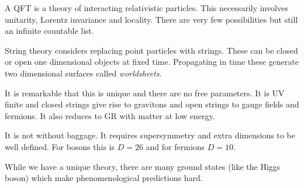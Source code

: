 A QFT is a theory of interacting relativistic  particles. This necessarily involves unitarity, Lorentz invariance and locality. There are very few possibilities but still an infinite countable list.

String theory considers replacing point particles with strings. These can be closed or open one dimensional objects at fixed time.
%
Propagating in time these generate two dimensional surfaces called \textit{worldsheets}.

It is remarkable that this is unique and there are no free parameters. It is UV finite and closed strings give rise to gravitons and open strings to gauge fields and fermions. It also reduces to GR with matter at low energy.

It is not without baggage. It requires supersymmetry and extra dimensions to be well defined. For bosons this is $D = 26$ and for fermions $D = 10$.

While we have a unique theory, there are many ground states (like the Higgs boson) which make phenomenological predictions hard.


